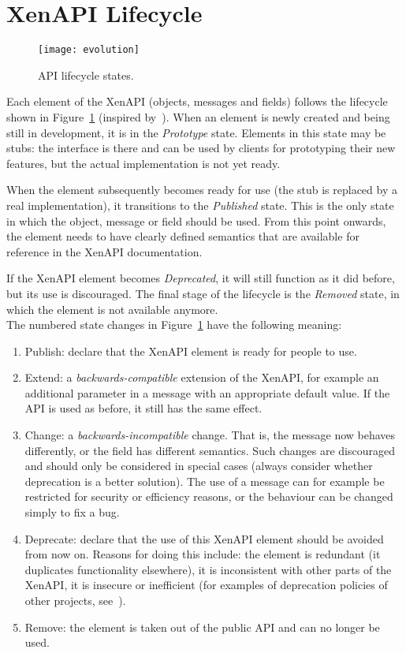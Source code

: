 \documentclass[a4paper]{article}
\newcommand{\Fig}[1]{Figure~\ref{#1}}
\begin{document}
\section{XenAPI Lifecycle}

\begin{figure}[t]
	\centering
	\texttt{[image: evolution]}
	\caption{API lifecycle states.}
	\label{fig:states}
\end{figure}

Each element of the XenAPI (objects, messages and fields) follows the lifecycle shown in \Fig{fig:states} (inspired by~\cite{symbian}). When an element is newly created and being still in development, it is in the \textit{Prototype} state. Elements in this state may be stubs: the interface is there and can be used by clients for prototyping their new features, but the actual implementation is not yet ready.

When the element subsequently becomes ready for use (the stub is replaced by a real implementation), it transitions to the \textit{Published} state. This is the only state in which the object, message or field should be used. From this point onwards, the element needs to have clearly defined semantics that are available for reference in the XenAPI documentation.

If the XenAPI element becomes \textit{Deprecated}, it will still function as it did before, but its use is discouraged. The final stage of the lifecycle is the \textit{Removed} state, in which the element is not available anymore.\\

The numbered state changes in \Fig{fig:states} have the following meaning:
\begin{enumerate}
\item Publish: declare that the XenAPI element is ready for people to use.
\item Extend: a \emph{backwards-compatible} extension of the XenAPI, for example an additional parameter in a message with an appropriate default value. If the API is used as before, it still has the same effect.
\item Change: a \emph{backwards-incompatible} change. That is, the message now behaves differently, or the field has different semantics. Such changes are discouraged and should only be considered in special cases (always consider whether deprecation is a better solution). The use of a message can for example be restricted for security or efficiency reasons, or the behaviour can be changed simply to fix a bug.
\item Deprecate: declare that the use of this XenAPI element should be avoided from now on. Reasons for doing this include: the element is redundant (it duplicates functionality elsewhere), it is inconsistent with other parts of the XenAPI, it is insecure or inefficient (for examples of deprecation policies of other projects, see~\cite{symbian,sun,eclipse,oval}).
\item Remove: the element is taken out of the public API and can no longer be used.
\end{enumerate}
\end{document}
